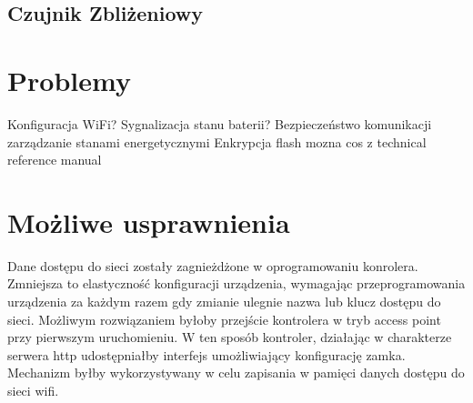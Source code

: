     \subsection{Czujnik Zbliżeniowy}


\section{Problemy}
    Konfiguracja WiFi?
    Sygnalizacja stanu baterii?
    Bezpieczeństwo komunikacji
    zarządzanie stanami energetycznymi
    Enkrypcja flash
    mozna cos z technical reference manual

\section{Możliwe usprawnienia}
Dane dostępu do sieci zostały zagnieżdżone w oprogramowaniu konrolera. Zmniejsza to elastyczność konfiguracji urządzenia, wymagając przeprogramowania urządzenia za każdym razem gdy zmianie ulegnie nazwa lub klucz dostępu do sieci. Możliwym rozwiązaniem byłoby przejście kontrolera w tryb access point przy pierwszym uruchomieniu. W ten sposób kontroler, działając w charakterze serwera http udostępniałby interfejs umożliwiający konfigurację zamka. Mechanizm byłby wykorzystywany w celu zapisania w pamięci danych dostępu do sieci wifi.